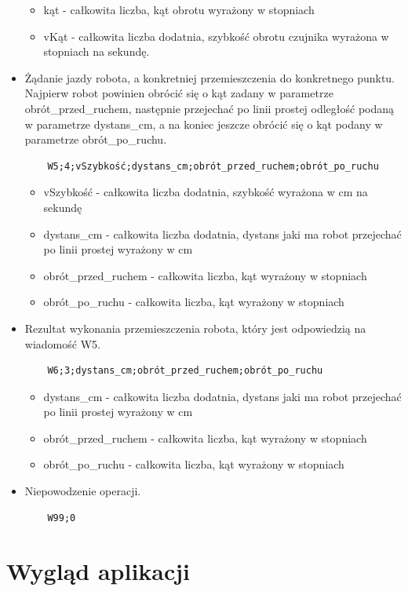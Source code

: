 \documentclass[a4paper,12pt]{article}
\begin{document}
\begin{itemize}
\begin{itemize}
	\item kąt - całkowita liczba, kąt obrotu wyrażony w stopniach
	\item vKąt - całkowita liczba dodatnia, szybkość obrotu czujnika wyrażona w stopniach na sekundę.
	\end{itemize}
\item Żądanie jazdy robota, a konkretniej przemieszczenia do konkretnego punktu. Najpierw robot powinien obrócić się o kąt zadany w parametrze obrót\_przed\_ruchem, następnie przejechać po linii prostej odległość podaną w parametrze dystans\_cm, a na koniec jeszcze obrócić się o kąt podany w parametrze obrót\_po\_ruchu. 
\begin{verbatim}
	W5;4;vSzybkość;dystans_cm;obrót_przed_ruchem;obrót_po_ruchu
\end{verbatim}
	\begin{itemize}
	\item vSzybkość - całkowita liczba dodatnia, szybkość wyrażona w cm na sekundę
	\item dystans\_cm - całkowita liczba dodatnia, dystans jaki ma robot przejechać po linii prostej wyrażony w cm
	\item obrót\_przed\_ruchem - całkowita liczba, kąt wyrażony w stopniach
	\item obrót\_po\_ruchu - całkowita liczba, kąt wyrażony w stopniach
	\end{itemize}
\item Rezultat wykonania przemieszczenia robota, który jest odpowiedzią na wiadomość W5.  
\begin{verbatim}
	W6;3;dystans_cm;obrót_przed_ruchem;obrót_po_ruchu
\end{verbatim}
	\begin{itemize}
	\item dystans\_cm - całkowita liczba dodatnia, dystans jaki ma robot przejechać po linii prostej wyrażony w cm
	\item obrót\_przed\_ruchem - całkowita liczba, kąt wyrażony w stopniach
	\item obrót\_po\_ruchu - całkowita liczba, kąt wyrażony w stopniach
	\end{itemize}
\item Niepowodzenie operacji.
\begin{verbatim}
	W99;0
\end{verbatim}
\end{itemize}


\section{Wygląd aplikacji}
\end{document}
